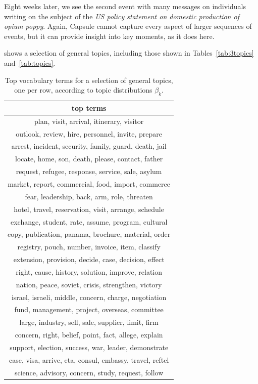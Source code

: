 Eight weeks later, we see the second event with many messages on individuals writing on the subject of the \emph{US policy statement on domestic production of opium poppy}.  Again, Capsule cannot capture every aspect of larger sequences of events, but it can provide insight into key moments, as it does here.

 shows a selection of general topics, including those shown in Tables~\ref{tab:3topics} and~\ref{tab:topics}.


\begin{table}
\centering
\small
\begin{tabular}{c}
\toprule
top terms \\
\midrule
plan, visit, arrival, itinerary, visitor \\
outlook, review, hire, personnel, invite, prepare \\
arrest, incident, security, family, guard, death, jail \\
locate, home, son, death, please, contact, father \\
request, refugee, response, service, sale, asylum \\
market, report, commercial, food, import, commerce \\
fear, leadership, back, arm, role, threaten \\
hotel, travel, reservation, visit, arrange, schedule \\
exchange, student, rate, assume, program, cultural \\
copy, publication, panama, brochure, material, order \\
registry, pouch, number, invoice, item, classify \\
extension, provision, decide, case, decision, effect \\
right, cause, history, solution, improve, relation \\
nation, peace, soviet, crisis, strengthen, victory \\
israel, israeli, middle, concern, charge, negotiation \\
fund, management, project, overseas, committee \\
large, industry, sell, sale, supplier, limit, firm \\
concern, right, belief, point, fact, allege, explain \\
support, election, success, war, leader, demonstrate \\
case, visa, arrive, eta, consul, embassy, travel, reftel \\
science, advisory, concern, study, request, follow \\
\bottomrule
\end{tabular}
\label{tab:generaltopics}
\caption{Top vocabulary terms for a selection of general topics, one per row, according to topic distributions $\beta_k$.}
\end{table}

